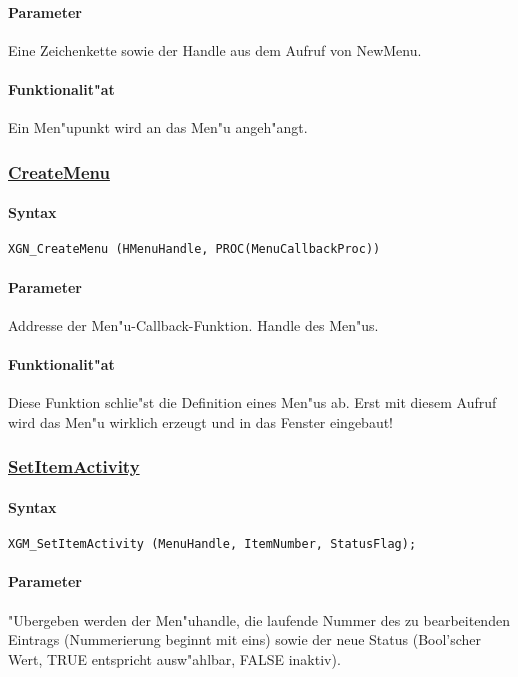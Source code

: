 \paragraph{Parameter}
Eine Zeichenkette sowie der Handle aus dem Aufruf von NewMenu.

\paragraph{Funktionalit"at}
Ein Men"upunkt wird an das Men"u angeh"angt.

\subsubsection{\underline{CreateMenu}}


\paragraph{Syntax}
\begin{verbatim}
XGN_CreateMenu (HMenuHandle, PROC(MenuCallbackProc))
\end{verbatim}

\paragraph{Parameter}
Addresse der Men"u-Callback-Funktion.
Handle des Men"us.

\paragraph{Funktionalit"at}
Diese Funktion schlie"st die Definition eines Men"us ab. Erst mit diesem
Aufruf wird das Men"u wirklich erzeugt und in das Fenster eingebaut!


\subsubsection{\underline{SetItemActivity}}

\paragraph{Syntax}
\begin{verbatim}
XGM_SetItemActivity (MenuHandle, ItemNumber, StatusFlag);
\end{verbatim}

\paragraph{Parameter}
"Ubergeben werden der Men"uhandle, die laufende Nummer des zu bearbeitenden
Eintrags (Nummerierung beginnt mit eins) sowie der neue Status (Bool'scher Wert,
TRUE entspricht ausw"ahlbar, FALSE inaktiv).


